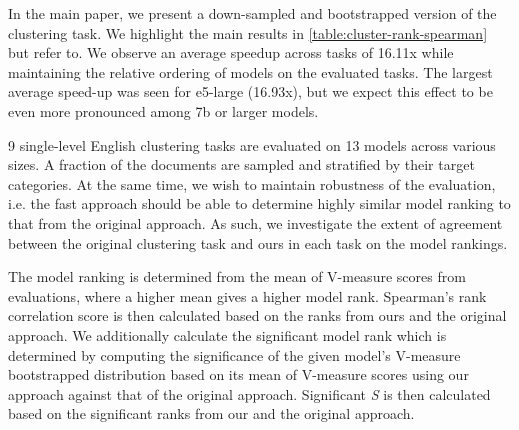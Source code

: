 \begin{table}[!th]
\centering
{}
\caption{Agreement on model rankings on a selection of English clustering tasks using Spearman's correlation across the scores of 13 models of various sizes.}
\label{table:cluster-rank-spearman}
\end{table}

In the main paper, we present a down-sampled and bootstrapped version of the clustering task. We highlight the main results in \autoref{table:cluster-rank-spearman} but refer to. We observe an average speedup across tasks of 16.11x while maintaining the relative ordering of models on the evaluated tasks. The largest average speed-up was seen for e5-large (16.93x), but we expect this effect to be even more pronounced among 7b or larger models.

9 single-level English clustering tasks are evaluated on 13 models across various sizes. A fraction of the documents are sampled and stratified by their target categories. At the same time, we wish to maintain robustness of the evaluation, i.e. the fast approach should be able to determine highly similar model ranking to that from the original approach. As such, we investigate the extent of agreement between the original clustering task and ours in each task on the model rankings. 

The model ranking is determined from the mean of V-measure scores from evaluations, where a higher mean gives a higher model rank. Spearman's rank correlation score is then calculated based on the ranks from ours and the original approach. 
We additionally calculate the significant model rank which is determined by computing the significance of the given model's V-measure bootstrapped distribution based on its mean of V-measure scores using our approach against that of the original approach. Significant \textit{S} is then calculated based on the significant ranks from our and the original approach. 

